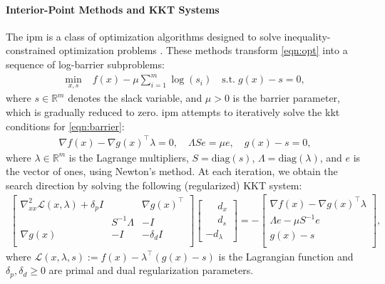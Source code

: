 \documentclass{article}
\begin{document}
\paragraph{Interior-Point Methods and KKT Systems}
The \gls*{ipm} is a class of optimization algorithms designed to solve inequality-constrained optimization problems \cite{nocedalNumericalOptimization2006}. These methods transform \cref{eqn:opt} into a sequence of log-barrier subproblems:
\begin{align}\label{eqn:barrier}
  \min_{x,s} \; & f(x) - \mu \sum_{i=1}^m \log(s_i) \quad \text{s.t.} \; g(x) - s = 0,
\end{align}
where $s \in \mathbb{R}^m$ denotes the slack variable, and $\mu > 0$ is the barrier parameter, which is gradually reduced to zero.
\Gls*{ipm} attempts to iteratively solve the \gls*{kkt} conditions for \cref{eqn:barrier}:
\begin{align}\label{eqn:kkt}
  \nabla f(x) - \nabla g(x)^\top \lambda = 0, \quad
  \Lambda S e = \mu e, \quad
  g(x) - s = 0,
\end{align}
where $\lambda \in \mathbb{R}^m$ is the Lagrange multipliers, $S = \text{diag}(s)$, $\Lambda = \text{diag}(\lambda)$, and $e$ is the vector of ones,
using Newton's method. At each iteration, we obtain the search direction by solving the following (regularized) KKT system:
\begin{align}\label{eqn:kkt_system}
  \begin{bmatrix}
    \nabla^2_{x x} \mathcal{L}(x,\lambda) + \delta_p I & & \nabla g(x)^\top  \\
                                          & S^{-1}\Lambda & -I \\
    \nabla g(x) & -I &  - \delta_d I\\
  \end{bmatrix}
  \begin{bmatrix}
    \phantom{-}d_x\\
    \phantom{-}d_s \\
    -d_\lambda
  \end{bmatrix} =
  -\begin{bmatrix}
    \nabla f(x) - \nabla g(x)^\top \lambda\\
    \Lambda e - \mu S^{-1} e \\
    g(x) - s\\
  \end{bmatrix},
\end{align}
where $\mathcal{L}(x,\lambda,s) := f(x) - \lambda^\top (g(x)-s)$ is the Lagrangian function and $\delta_p, \delta_d \geq 0$ are primal and dual regularization parameters.
\end{document}
